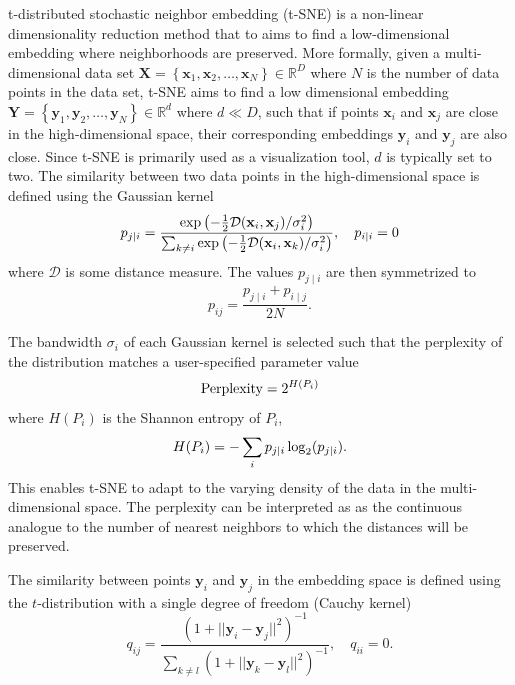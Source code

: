 \documentclass[article]{jss}
\begin{document}
t-distributed stochastic neighbor embedding (t-SNE) is a non-linear
dimensionality reduction method that to aims to find a low-dimensional embedding
where neighborhoods are preserved. More formally, given a multi-dimensional data set
$\mathbf{X} = \left \{ \mathbf{x}_1, \mathbf{x}_2, \dots, \mathbf{x}_N \right \}
\in \mathbb{R}^D$ where $N$ is the number of data points in the data set, t-SNE
aims to find a low dimensional embedding $\mathbf{Y} = \left \{ \mathbf{y}_1,
\mathbf{y}_2, \dots, \mathbf{y}_N \right\} \in \mathbb{R}^d$ where $d \ll D$,
such that if points $\mathbf{x}_i$ and $\mathbf{x}_j$ are close in the
high-dimensional space, their corresponding embeddings $\mathbf{y}_i$ and
$\mathbf{y}_j$ are also close. Since t-SNE is primarily used as a visualization
tool, $d$ is typically set to two. The similarity between two data points in the
high-dimensional space is defined using the Gaussian kernel
\begin{equation}
p_{j \mid i} = \frac{\exp \left ( -\frac{1}{2} \mathcal{D}(\mathbf{x}_i, \mathbf{x}_j ) / \sigma_i^2 \right )}
{\sum_{k \neq i } \exp \left ( -\frac{1}{2} \mathcal{D}(\mathbf{x}_i, \mathbf{x}_k ) / \sigma_i^2 \right )}, \quad p_{i \mid i} = 0 \notag
\label{eq:gaussian_kernel}
\end{equation}
where $\mathcal{D}$ is some distance measure. The values $p_{j \mid i}$
are then symmetrized to
\begin{equation}
p_{ij} = \frac{p_{j \mid i} + p_{i \mid j}}{2N}.
\label{eq:symmetrize}
\end{equation}

The bandwidth $\sigma_i$ of each Gaussian kernel is selected such that the perplexity of the distribution matches a user-specified parameter value
\begin{equation}
\text{Perplexity} = 2^{H(P_i)} \notag
\end{equation}
where $H(P_i)$ is the Shannon entropy of $P_i$,
\begin{equation}
H(P_i) = -\sum_i p_{j \mid i} \log_2 (p_{j \mid i}). \notag
\end{equation}
This enables t-SNE to adapt to the varying density of the data in the
multi-dimensional space. The perplexity can be interpreted as as the continuous
analogue to the number of nearest neighbors to which the distances will be
preserved. 

The similarity between points $\mathbf{y}_i$ and $\mathbf{y}_j$ in the embedding
space is defined using the $t$-distribution with a single degree of freedom
(Cauchy kernel)
\begin{equation}
q_{ij} = \frac{\left ( 1 + || \mathbf{y}_i - \mathbf{y}_j ||^2 \right )^{-1}}
{\sum_{k \neq l}\left ( 1 + || \mathbf{y}_k - \mathbf{y}_l ||^2 \right )^{-1}},
\quad q_{ii} = 0.
\label{eq:cauchy_kernel}
\end{equation}
\end{document}
